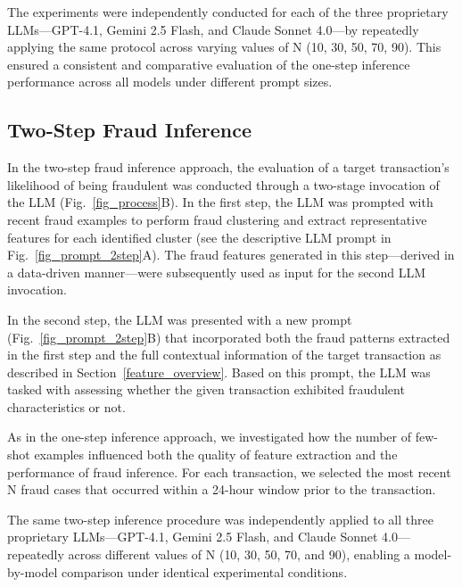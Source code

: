 \documentclass[sigconf]{acmart}
\begin{document}
The experiments were independently conducted for each of the three proprietary LLMs—GPT-4.1, Gemini 2.5 Flash, and Claude Sonnet 4.0—by repeatedly applying the same protocol across varying values of N (10, 30, 50, 70, 90). This ensured a consistent and comparative evaluation of the one-step inference performance across all models under different prompt sizes.






\subsection{Two-Step Fraud Inference}

In the two-step fraud inference approach, the evaluation of a target transaction's likelihood of being fraudulent was conducted through a two-stage invocation of the LLM (Fig.~\ref{fig_process}B).
In the first step, the LLM was prompted with recent fraud examples to perform fraud clustering and extract representative features for each identified cluster (see the descriptive LLM prompt in Fig.~\ref{fig_prompt_2step}A). The fraud features generated in this step—derived in a data-driven manner—were subsequently used as input for the second LLM invocation.

In the second step, the LLM was presented with a new prompt (Fig.~\ref{fig_prompt_2step}B) that incorporated both the fraud patterns extracted in the first step and the full contextual information of the target transaction as described in Section~\ref{feature_overview}. Based on this prompt, the LLM was tasked with assessing whether the given transaction exhibited fraudulent characteristics or not.

As in the one-step inference approach, we investigated how the number of few-shot examples influenced both the quality of feature extraction and the performance of fraud inference. For each transaction, we selected the most recent N fraud cases that occurred within a 24-hour window prior to the transaction. 

The same two-step inference procedure was independently applied to all three proprietary LLMs—GPT-4.1, Gemini 2.5 Flash, and Claude Sonnet 4.0—repeatedly across different values of N (10, 30, 50, 70, and 90), enabling a model-by-model comparison under identical experimental conditions.
\end{document}

